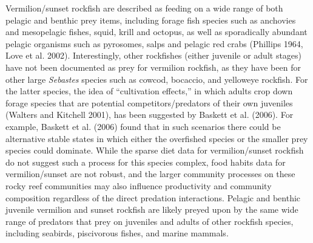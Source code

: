 \documentclass[11pt,
  english,
]{article}
\begin{document}
Vermilion/sunset rockfish are described as feeding on a wide range of both pelagic and benthic prey items, including forage fish species such as anchovies and mesopelagic fishes, squid, krill and octopus, as well as sporadically abundant pelagic organisms such as pyrosomes, salps and pelagic red crabs {(Phillips 1964, Love et al. 2002)\leavevmode\tagmcend\tagstructend}. Interestingly, other rockfishes (either juvenile or adult stages) have not been documented as prey for vermilion rockfish, as they have been for other large \emph{Sebastes} species such as cowcod, bocaccio, and yelloweye rockfish. For the latter species, the idea of ``cultivation effects,'' in which adults crop down forage species that are potential competitors/predators of their own juveniles {(Walters and Kitchell 2001)\leavevmode\tagmcend\tagstructend}, has been suggested by {Baskett et al. (2006)\leavevmode\tagmcend\tagstructend}. For example, Baskett et al. {(2006)\leavevmode\tagmcend\tagstructend} found that in such scenarios there could be alternative stable states in which either the overfished species or the smaller prey species could dominate. While the sparse diet data for vermilion/sunset rockfish do not suggest such a process for this species complex, food habits data for vermilion/sunset are not robust, and the larger community processes on these rocky reef communities may also influence productivity and community composition regardless of the direct predation interactions. Pelagic and benthic juvenile vermilion and sunset rockfish are likely preyed upon by the same wide range of predators that prey on juveniles and adults of other rockfish species, including seabirds, piscivorous fishes, and marine mammals.
\end{document}
